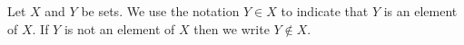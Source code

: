 \label{def:SetInclusion}
\begin{df}[$\in$]
    Let $X$ and $Y$ be sets. 
    We use the notation $Y \in X$ to indicate 
    that $Y$ is an element of $X$. 
    If $Y$ is not an element of $X$ then we write
    $Y \not \in X$. 
\end{df}
